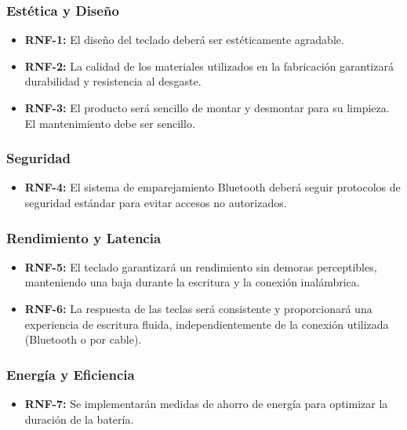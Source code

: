\subsubsection{Estética y Diseño}
\begin{itemize}
\item \textbf{RNF-1:} El diseño del teclado deberá ser estéticamente agradable.
\item \textbf{RNF-2:} La calidad de los materiales utilizados en la fabricación garantizará durabilidad y resistencia al desgaste.
\item \textbf{RNF-3:} El producto será sencillo de montar y desmontar para su limpieza. El mantenimiento debe ser sencillo.
\end{itemize}

\subsubsection{Seguridad}
\begin{itemize}
\item \textbf{RNF-4:} El sistema de emparejamiento \gls{Bluetooth} deberá seguir protocolos de seguridad estándar para evitar accesos no autorizados.
\end{itemize}

\subsubsection{Rendimiento y Latencia} \label{DiseñoRendimiento}
\begin{itemize}
\item \textbf{RNF-5:} El teclado garantizará un rendimiento sin demoras perceptibles, manteniendo una baja  durante la escritura y la conexión inalámbrica.
\item \textbf{RNF-6:} La respuesta de las teclas será consistente y proporcionará una experiencia de escritura fluida, independientemente de la conexión utilizada (\gls{Bluetooth} o por cable).
\end{itemize}

\subsubsection{Energía y Eficiencia} \label{DiseñoAhorroEnergia}
\begin{itemize}
\item \textbf{RNF-7:} Se implementarán medidas de ahorro de energía para optimizar la duración de la batería.
\end{itemize}

